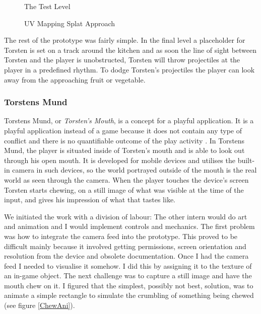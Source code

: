 \begin{center}
  \begin{figure}
    \noindent{}
    \caption{The Test Level}
    \label{TestScene}
  \end{figure}
\end{center}

\begin{center}
  \begin{figure}
    \noindent{}
    \caption{UV Mapping Splat Approach}
    \label{UVSplat}
  \end{figure}
\end{center}

The rest of the prototype was fairly simple. In the final level a placeholder for Torsten is set on a track around the kitchen and as soon the line of sight between Torsten and the player is unobstructed, Torsten will throw projectiles at the player in a predefined rhythm. To dodge Torsten's projectiles the player can look away from the approaching fruit or vegetable.

\subsubsection{Torstens Mund}
Torstens Mund, or \textit{Torsten's Mouth}, is a concept for a playful application. It is a playful application instead of a game because it does not contain any type of conflict and there is no quantifiable outcome of the play activity \cite[ch. 7, p. 11]{salen}. In Torstens Mund, the player is situated inside of Torsten's mouth and is able to look out through his open mouth. It is developed for mobile devices and utilises the built-in camera in such devices, so the world portrayed outside of the mouth is the real world as seen through the camera. When the player touches the device's screen Torsten starts chewing, on a still image of what was visible at the time of the input, and gives his impression of what that tastes like.

We initiated the work with a division of labour: The other intern would do art and animation and I would implement controls and mechanics. The first problem was how to integrate the camera feed into the prototype. This proved to be difficult mainly because it involved getting permissions, screen orientation and resolution from the device and obsolete documentation. Once I had the camera feed I needed to visualise it somehow. I did this by assigning it to the texture of an in-game object. The next challenge was to capture a still image and have the mouth chew on it. I figured that the simplest, possibly not best, solution, was to animate a simple rectangle to simulate the crumbling of something being chewed (see figure \ref{ChewAni}).

